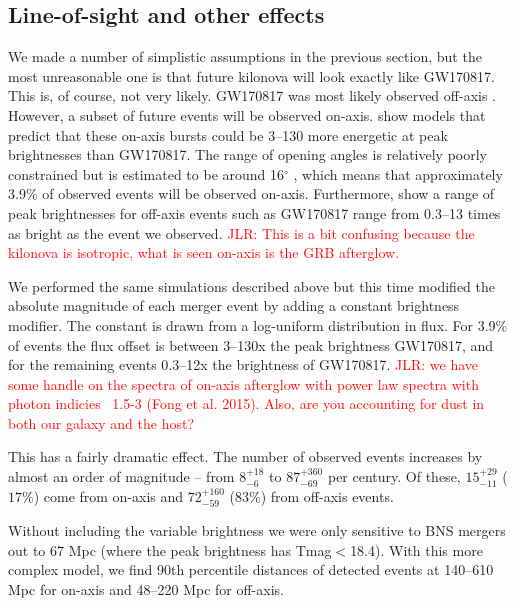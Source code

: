 \documentclass[modern]{aastex61}
\newcommand{\red}[1]{\textcolor{red}{#1}}
\begin{document}
\subsection{Line-of-sight and other effects}
We made a number of simplistic assumptions in the previous section, but the most unreasonable one is that future kilonova will look exactly like GW170817. This is, of course, not very likely. GW170817 was most likely observed off-axis \citep{Troja2017,Abbott2017a}. However, a subset of future events will be observed on-axis. \citet{Metzger2012} show models that predict that these on-axis bursts could be 3--130 more energetic at peak brightnesses than GW170817. %
The range of opening angles is relatively poorly constrained but is estimated to be around 16$^\circ$ \citep{Fong2015}, which means that approximately 3.9\% of observed events will be observed on-axis. 
Furthermore, \citet{Metzger2012} show a range of peak brightnesses for off-axis events such as GW170817 range from 0.3--13 times as bright as the event we observed. \red{JLR: This is a bit confusing because the kilonova is isotropic, what is seen on-axis is the GRB afterglow.}

We performed the same simulations described above but this time modified the absolute magnitude of each merger event by adding a constant brightness modifier. The constant is drawn from a log-uniform distribution in flux. For 3.9\% of events the flux offset is between 3--130x the peak brightness GW170817, and for the remaining events 0.3--12x the brightness of GW170817. \red{JLR: we have some handle on the spectra of on-axis afterglow with power law spectra with photon indicies ~1.5-3 (Fong et al. 2015).  Also, are you accounting for dust in both our galaxy and the host?}

This has a fairly dramatic effect. The number of observed events increases by almost an order of magnitude -- from $8^{+18}_{-6}$ to $87^{+360}_{-69}$ per century. Of these, $15^{+29}_{-11}$ ($17$\%) come from on-axis and $72^{+160}_{-59}$ ($83$\%) from off-axis events. 

Without including the variable brightness we were only sensitive to BNS mergers out to 67 Mpc (where the peak brightness has Tmag$<$18.4). With this more complex model, we find 90th percentile distances of detected events at 140--610 Mpc for on-axis and 48--220 Mpc for off-axis.
\end{document}
